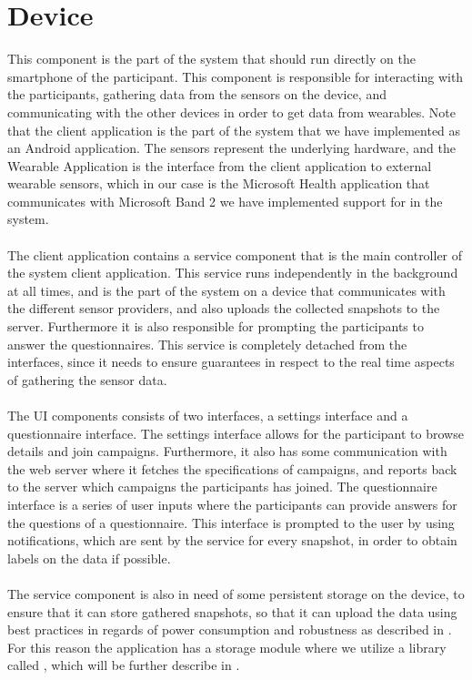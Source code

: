 
\section{Device}
\label{sec:device}
This component is the part of the system that should run directly on the smartphone of the participant. This component is responsible for interacting with the participants, gathering data from the sensors on the device, and communicating with the other devices in order to get data from wearables. Note that the client application is the part of the system that we have implemented as an Android application. The sensors represent the underlying hardware, and the Wearable Application is the interface from the client application to external wearable sensors, which in our case is the Microsoft Health application that communicates with Microsoft Band 2 we have implemented support for in the system.
\\\\
The client application contains a service component that is the main controller of the system client application. This service runs independently in the background at all times, and is the part of the system on a device that communicates with the different sensor providers, and also uploads the collected snapshots to the server. Furthermore it is also responsible for prompting the participants to answer the questionnaires. This service is completely detached from the interfaces, since it needs to ensure guarantees in respect to the real time aspects of gathering the sensor data.
\\\\
The UI components consists of two interfaces, a settings interface and a questionnaire interface. The settings interface allows for the participant to browse details and join campaigns. Furthermore, it also has some communication with the web server where it fetches the specifications of campaigns, and reports back to the server which campaigns the participants has joined. The questionnaire interface is a series of user inputs where the participants can provide answers for the questions of a questionnaire. This interface is prompted to the user by using notifications, which are sent by the service for every snapshot, in order to obtain labels on the data if possible.
\\\\
The service component is also in need of some persistent storage on the device, to ensure that it can store gathered snapshots, so that it can upload the data using best practices in regards of power consumption and robustness as described in . For this reason the application has a storage module where we utilize a library called , which will be further describe in .
